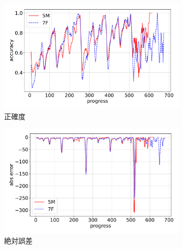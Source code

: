 \begin{figure}[t]
\centering
\begin{subfigure}[b]{0.8\linewidth}
    \includegraphics[width=\linewidth]{pdf/compare/EXP6_NT5M_and_NT7F/accuracy.pdf}
    \caption{正確度}
    \label{fig:EXP6_NT5M_and_NT7F_accuracy}
\end{subfigure}
\begin{subfigure}[b]{0.8\linewidth}
    \includegraphics[width=\linewidth]{pdf/compare/EXP6_NT5M_and_NT7F/error_abs.pdf}
    \caption{絶対誤差}
    \label{fig:EXP6_NT5M_and_NT7F_error_abs_diff}
\end{subfigure}
\begin{subfigure}[b]{0.8\linewidth}

\end{subfigure}
\end{figure}
